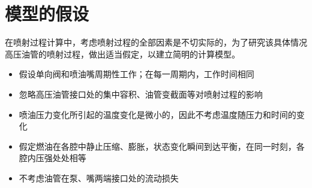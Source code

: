 \documentclass[withoutpreface,bwprint]{cumcmthesis} %
\begin{document}
	\section{模型的假设}
	在喷射过程计算中，考虑喷射过程的全部因素是不切实际的，为了研究该具体情况高压油管的喷射过程，做出适当假定，以建立简明的计算模型。
	\begin{itemize}
		\item 假设单向阀和喷油嘴周期性工作；在每一周期内，工作时间相同
		\item 忽略高压油管接口处的集中容积、油管变截面等对喷射过程的影响
		\item 喷油压力变化所引起的温度变化是微小的\cite{bib:one}，因此不考虑温度随压力和时间的变化
		\item 假定燃油在各腔中静止压缩、膨胀，状态变化瞬间到达平衡，在同一时刻，各腔内压强处处相等
		\item 不考虑油管在泵、嘴两端接口处的流动损失
		
	\end{itemize}
	
\end{document}
